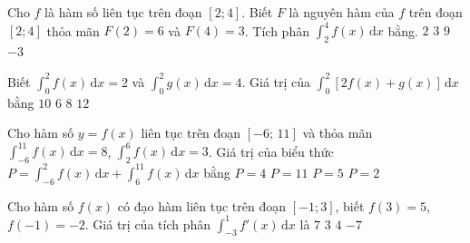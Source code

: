 \begin{ex}%
	Cho $f$ là hàm số liên tục trên đoạn $[2;4]$. Biết $F$ là nguyên hàm của $f$ trên đoạn $[2; 4]$ thỏa mãn $F(2)=6$  và $F(4)=3$. Tích phân $\displaystyle\int_2^4f(x)\mathrm{\,d}x$ bằng.
	 \choice
		 {$2$}
		 {$3$}
		 {$9$}
		{\True  $-3$}
\end{ex}

\begin{ex}%
	Biết $\displaystyle\int^2_0f(x)\mathrm{\,d}x=2$  và $\displaystyle\int^2_0g(x)\mathrm{\,d}x=4$. Giá trị của $\displaystyle\int^2_0\left[2f(x)+g(x)\right]\mathrm{\,d}x$ bằng
	\choice 
		{$10$} 
		 {$6$}
		 {\True $8$}
		{$12$} 
\end{ex}

\begin{ex}%
	Cho hàm số $ y=f(x)$ liên tục trên đoạn $\left[-6;\,11\right]$ và thỏa mãn $\displaystyle\int_{-6}^{11}{f(x)\mathrm{\,d}x}=8$, $\displaystyle\int_2^6{f(x)\mathrm{\,d}x}=3$. Giá trị của biểu thức $P=\displaystyle\int_{-6}^2{f(x)\mathrm{\,d}x}+\displaystyle\int_6^{11}{f(x)\mathrm{\,d}x}$  bằng
	\choice 
		 {$P=4$}
		 {$P=11$}
		 {\True $P=5$}
		{$P=2$} 
\end{ex}

\begin{ex}%
	Cho hàm số $f(x)$ có đạo hàm liên tục trên đoạn $[-1;3]$, biết $f(3)=5$,  $f(-1)=-2$. Giá trị của tích phân $\displaystyle\int_{-3}^1 f'(x)\mathrm{\,d}x$ là
	 \choice
		{\True  $7$}
		{$3$} 
		{$4$} 
		 {$-7$}
\end{ex}

